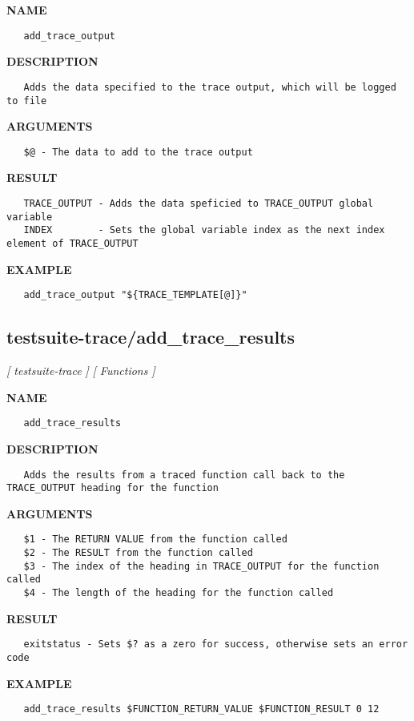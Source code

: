 \label{ch:robo47}
\label{ch:testsuite_trace_add_trace_output}
\textbf{NAME}
\begin{verbatim}
   add_trace_output
\end{verbatim}
\textbf{DESCRIPTION}
\begin{verbatim}
   Adds the data specified to the trace output, which will be logged to file
\end{verbatim}
\textbf{ARGUMENTS}
\begin{verbatim}
   $@ - The data to add to the trace output
\end{verbatim}
\textbf{RESULT}
\begin{verbatim}
   TRACE_OUTPUT - Adds the data speficied to TRACE_OUTPUT global variable
   INDEX        - Sets the global variable index as the next index element of TRACE_OUTPUT
\end{verbatim}
\textbf{EXAMPLE}
\begin{verbatim}
   add_trace_output "${TRACE_TEMPLATE[@]}"
\end{verbatim}
\newpage
\subsection{testsuite-trace/add\_trace\_results}
\textsl{[ testsuite-trace ]}
\textsl{[ Functions ]}

\label{ch:robo48}
\label{ch:testsuite_trace_add_trace_results}
\textbf{NAME}
\begin{verbatim}
   add_trace_results
\end{verbatim}
\textbf{DESCRIPTION}
\begin{verbatim}
   Adds the results from a traced function call back to the TRACE_OUTPUT heading for the function 
\end{verbatim}
\textbf{ARGUMENTS}
\begin{verbatim}
   $1 - The RETURN VALUE from the function called
   $2 - The RESULT from the function called
   $3 - The index of the heading in TRACE_OUTPUT for the function called
   $4 - The length of the heading for the function called 
\end{verbatim}
\textbf{RESULT}
\begin{verbatim}
   exitstatus - Sets $? as a zero for success, otherwise sets an error code
\end{verbatim}
\textbf{EXAMPLE}
\begin{verbatim}
   add_trace_results $FUNCTION_RETURN_VALUE $FUNCTION_RESULT 0 12
\end{verbatim}
\newpage
